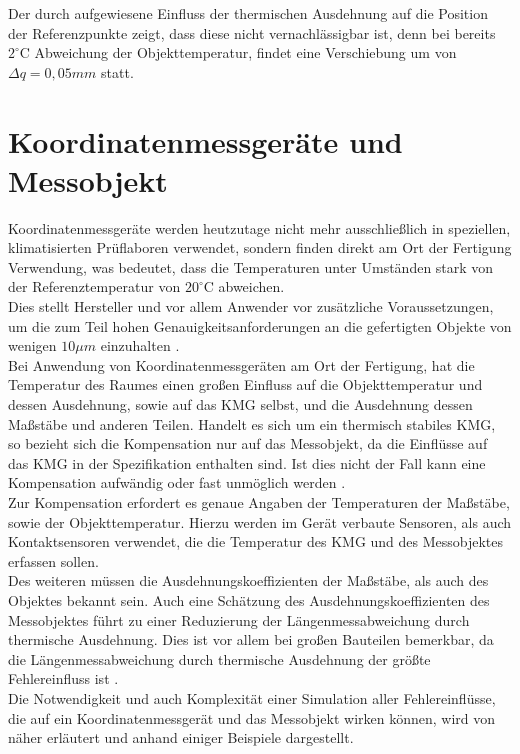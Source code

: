 \newpage
Der durch \cite{losler2010} aufgewiesene Einfluss der thermischen Ausdehnung auf die Position der Referenzpunkte zeigt, dass diese nicht vernachlässigbar ist, denn bei bereits $2^\circ\text{C}$ Abweichung der Objekttemperatur, findet eine Verschiebung um von $\Delta q = 0,05mm $ statt.


\section{Koordinatenmessgeräte und Messobjekt}\label{sec:KMG}

Koordinatenmessgeräte werden heutzutage nicht mehr ausschließlich in speziellen, klimatisierten Prüflaboren verwendet, sondern finden direkt am Ort der Fertigung Verwendung, was bedeutet, dass die Temperaturen unter Umständen stark von der Referenztemperatur von $20^\circ\text{C}$ abweichen.\\
Dies stellt Hersteller und vor allem Anwender vor zusätzliche Voraussetzungen, um die zum Teil hohen Genauigkeitsanforderungen an die gefertigten Objekte von wenigen $10\mu m $ einzuhalten \cite{Ferger}.\\
Bei Anwendung von Koordinatenmessgeräten am Ort der Fertigung, hat die Temperatur des Raumes einen großen Einfluss auf die Objekttemperatur und dessen Ausdehnung, sowie auf das KMG selbst, und die Ausdehnung dessen Maßstäbe und anderen Teilen.
Handelt es sich um ein \glqq thermisch stabiles KMG\grqq \cite{Neumann08}, so bezieht sich die Kompensation nur auf das Messobjekt, da die Einflüsse auf das KMG in der Spezifikation enthalten sind. Ist dies nicht der Fall kann eine Kompensation aufwändig oder fast unmöglich werden \cite{Neumann08}. \\
Zur Kompensation erfordert es genaue Angaben der Temperaturen der Maßstäbe, sowie der Objekttemperatur. Hierzu werden im Gerät verbaute Sensoren, als auch Kontaktsensoren verwendet, die die Temperatur des KMG und des Messobjektes erfassen sollen.\\
Des weiteren müssen die Ausdehnungskoeffizienten der Maßstäbe, als auch des Objektes bekannt sein. Auch eine Schätzung des Ausdehnungskoeffizienten des Messobjektes führt zu einer Reduzierung der Längenmessabweichung durch thermische Ausdehnung. Dies ist vor allem bei großen Bauteilen bemerkbar, da die Längenmessabweichung durch thermische Ausdehnung der größte Fehlereinfluss ist \cite{Ferger}.\\
Die Notwendigkeit und auch Komplexität einer Simulation aller Fehlereinflüsse, die auf ein Koordinatenmessgerät und das Messobjekt wirken können, wird von \cite{baldwin2007} näher erläutert und anhand einiger Beispiele dargestellt.\\

